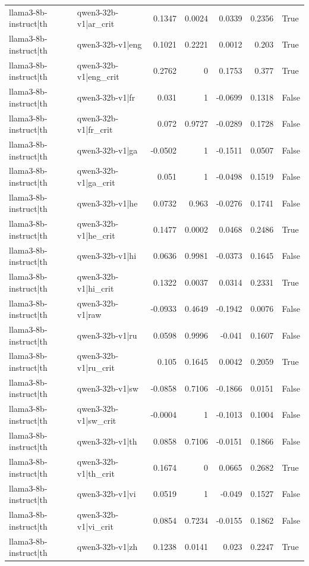 \begin{table}
\begin{tabular}{l l r r r r l}
llama3-8b-instruct|th & qwen3-32b-v1|ar_crit & 0.1347 & 0.0024 & 0.0339 & 0.2356 & True \\
llama3-8b-instruct|th & qwen3-32b-v1|eng & 0.1021 & 0.2221 & 0.0012 & 0.203 & True \\
llama3-8b-instruct|th & qwen3-32b-v1|eng_crit & 0.2762 & 0 & 0.1753 & 0.377 & True \\
llama3-8b-instruct|th & qwen3-32b-v1|fr & 0.031 & 1 & -0.0699 & 0.1318 & False \\
llama3-8b-instruct|th & qwen3-32b-v1|fr_crit & 0.072 & 0.9727 & -0.0289 & 0.1728 & False \\
llama3-8b-instruct|th & qwen3-32b-v1|ga & -0.0502 & 1 & -0.1511 & 0.0507 & False \\
llama3-8b-instruct|th & qwen3-32b-v1|ga_crit & 0.051 & 1 & -0.0498 & 0.1519 & False \\
llama3-8b-instruct|th & qwen3-32b-v1|he & 0.0732 & 0.963 & -0.0276 & 0.1741 & False \\
llama3-8b-instruct|th & qwen3-32b-v1|he_crit & 0.1477 & 0.0002 & 0.0468 & 0.2486 & True \\
llama3-8b-instruct|th & qwen3-32b-v1|hi & 0.0636 & 0.9981 & -0.0373 & 0.1645 & False \\
llama3-8b-instruct|th & qwen3-32b-v1|hi_crit & 0.1322 & 0.0037 & 0.0314 & 0.2331 & True \\
llama3-8b-instruct|th & qwen3-32b-v1|raw & -0.0933 & 0.4649 & -0.1942 & 0.0076 & False \\
llama3-8b-instruct|th & qwen3-32b-v1|ru & 0.0598 & 0.9996 & -0.041 & 0.1607 & False \\
llama3-8b-instruct|th & qwen3-32b-v1|ru_crit & 0.105 & 0.1645 & 0.0042 & 0.2059 & True \\
llama3-8b-instruct|th & qwen3-32b-v1|sw & -0.0858 & 0.7106 & -0.1866 & 0.0151 & False \\
llama3-8b-instruct|th & qwen3-32b-v1|sw_crit & -0.0004 & 1 & -0.1013 & 0.1004 & False \\
llama3-8b-instruct|th & qwen3-32b-v1|th & 0.0858 & 0.7106 & -0.0151 & 0.1866 & False \\
llama3-8b-instruct|th & qwen3-32b-v1|th_crit & 0.1674 & 0 & 0.0665 & 0.2682 & True \\
llama3-8b-instruct|th & qwen3-32b-v1|vi & 0.0519 & 1 & -0.049 & 0.1527 & False \\
llama3-8b-instruct|th & qwen3-32b-v1|vi_crit & 0.0854 & 0.7234 & -0.0155 & 0.1862 & False \\
llama3-8b-instruct|th & qwen3-32b-v1|zh & 0.1238 & 0.0141 & 0.023 & 0.2247 & True \\

\end{tabular}
\end{table}
